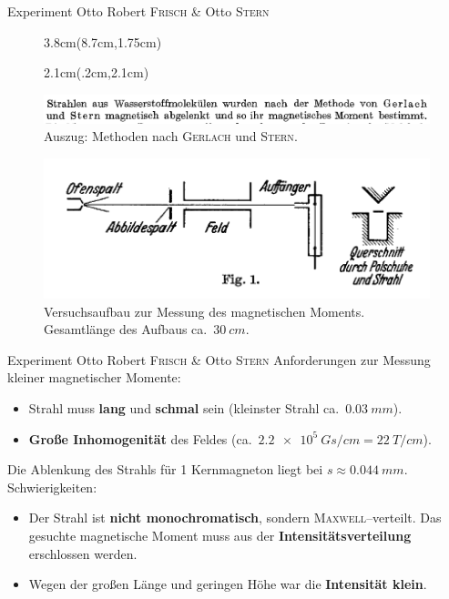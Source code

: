 \documentclass[t,9pt]{beamer}
\newcommand{\highlight}[3]{ \begin{textblock*}{#1}(#2,#3) \begin{tcolorbox} [enhanced,opacityfill=.1,colback=blue] \end{tcolorbox} \end{textblock*} } %
\begin{document}
        \begin{frame}{Experiment Otto Robert \textsc{Frisch} \& Otto \textsc{Stern}} 
                \begin{figure}
                        \highlight{3.8cm}{8.7cm}{1.75cm}
                        \highlight{2.1cm}{.2cm}{2.1cm}
                        \includegraphics[width=\textwidth]{prosi_nach_methode_stern_gerlach.png}
                        \caption{Auszug: Methoden nach \textsc{Gerlach} und \textsc{Stern}.\cite{FrischStern1933}}
                \end{figure} 
                \begin{figure}
                        \includegraphics[width=.8\textwidth]{prosi_versuchsaufbau_mag_moment.png}
                        \caption{Versuchsaufbau zur Messung des magnetischen Moments. Gesamtlänge des Aufbaus ca.\ $\SI{30}{cm}$.\cite{FrischStern1933}}
                \end{figure}
        \end{frame}

        \begin{frame}{Experiment Otto Robert \textsc{Frisch} \& Otto \textsc{Stern}\cite{FrischStern1933}}
                Anforderungen zur Messung kleiner magnetischer Momente:\\
                \begin{itemize}
                        \item Strahl muss \textbf{lang} und \textbf{schmal} sein (kleinster Strahl ca.\ $\SI{0.03}{mm}$).
                        \item \textbf{Große Inhomogenität} des Feldes (ca.\ $\SI{2.2e+5}{Gs/cm}=\SI{22}{T/cm}$).
                \end{itemize}
                \pause
                \vspace{.5cm} Die Ablenkung des Strahls für 1 Kernmagneton liegt bei $s\approx \SI{0.044}{mm}$.
                \pause
                \\\vspace{.5cm}Schwierigkeiten:
                \begin{itemize}
                        \item Der Strahl ist \textbf{nicht monochromatisch}, sondern \textsc{Maxwell}--verteilt. Das gesuchte magnetische Moment muss aus der \textbf{Intensitätsverteilung} erschlossen werden.
                        \item Wegen der großen Länge und geringen Höhe war die \textbf{Intensität klein}.
                \end{itemize}
        \end{frame}
\end{document}
